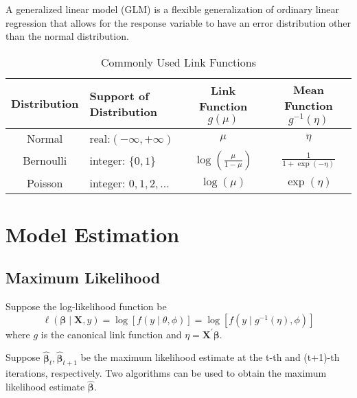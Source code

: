 \begin{note}
    A generalized linear model (GLM) is a flexible generalization of ordinary linear regression that allows for the response variable to have an error distribution other than the normal distribution.
\end{note}

\begin{table}[hpt]
    \centering
    \caption{Commonly Used Link Functions}
    \begin{tabular}{clcc}
        \toprule
        Distribution & Support of Distribution  & Link Function $g(\mu)$               & Mean Function $g^{-1}(\eta)$ \\
        \midrule
        Normal       & real:$(-\infty,+\infty)$ & $\mu$                                & $\eta$                       \\
        Bernoulli    & integer: $\{0,1\}$       & $\log\left(\frac{\mu}{1-\mu}\right)$ & $\frac{1}{1+\exp(-\eta)}$    \\
        Poisson      & integer: $0,1,2,\ldots$  & $\log\left(\mu\right)$               & $\exp\left(\eta\right)$      \\
        \bottomrule
    \end{tabular}
\end{table}

\section{Model Estimation}

\subsection{Maximum Likelihood}

Suppose the log-likelihood function be
\begin{equation}
    \ell\left(\boldsymbol{\beta}\mid\mathbf{X},y\right)=\log\left[f\left(y\mid\theta,\phi\right)\right]=\log\left[f\left(y\mid g^{-1}(\eta),\phi\right)\right]
\end{equation}
where $g$ is the canonical link function and $\eta=\mathbf{X}^{\prime}\boldsymbol{\beta}$.

Suppose $\hat{\boldsymbol{\beta}}_{t},\hat{\boldsymbol{\beta}}_{t+1}$ be the maximum likelihood estimate at the t-th and (t+1)-th iterations, respectively. Two algorithms can be used to obtain the maximum likelihood estimate $\hat{\boldsymbol{\beta}}$.

